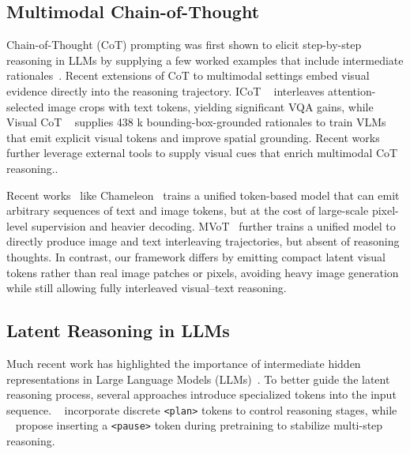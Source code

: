 \subsection{Multimodal Chain-of-Thought}
Chain-of-Thought (CoT) prompting was first shown to elicit step-by-step reasoning in LLMs by supplying a few worked examples that include intermediate rationales~\citep{feng2023towards,zhang2024chain, wei2023chainofthoughtpromptingelicitsreasoning}.
Recent extensions of CoT to multimodal settings embed visual evidence directly into the reasoning trajectory. ICoT ~\citep{zhang2024multimodalchainofthoughtreasoninglanguage} interleaves attention-selected image crops with text tokens, yielding significant VQA gains, while Visual CoT ~\citep{shao2024visualcotadvancingmultimodal} supplies 438 k bounding-box-grounded rationales to train VLMs that emit explicit visual tokens and improve spatial grounding.
Recent works~\citep{hu2024visual,zhou2024image,yang20253d,gao2024cantor, wu2025reinforcing, chern2025thinking,fang2025intention, cheng2025visual, su2025openthinkimg} further leverage external tools to supply visual cues that enrich multimodal CoT reasoning..

Recent works~\citep{chen2025blip3, wang2025autoregressive} like Chameleon~\citep{chameleonteam2025chameleonmixedmodalearlyfusionfoundation,chern2024anole} trains a unified token-based model that can emit arbitrary sequences of text and image tokens, but at the cost of large-scale pixel-level supervision and heavier decoding. MVoT~\citep{li2025imagine} further trains a unified model to directly produce image and text interleaving trajectories, but absent of reasoning thoughts.
In contrast, our \Model framework differs by emitting compact latent visual tokens rather than real image patches or pixels, avoiding heavy image generation while still allowing fully interleaved visual–text reasoning.

\subsection{Latent Reasoning in LLMs}

Much recent work has highlighted the importance of intermediate hidden representations in Large Language Models (LLMs)~\citep{biran2024hopping,yang2024large}. To better guide the latent reasoning process, several approaches introduce specialized tokens into the input sequence. ~\cite{wang2023guiding} incorporate discrete \texttt{<plan>} tokens to control reasoning stages, while ~\cite{goyal2023think} propose inserting a \texttt{<pause>} token during pretraining to stabilize multi-step reasoning.

